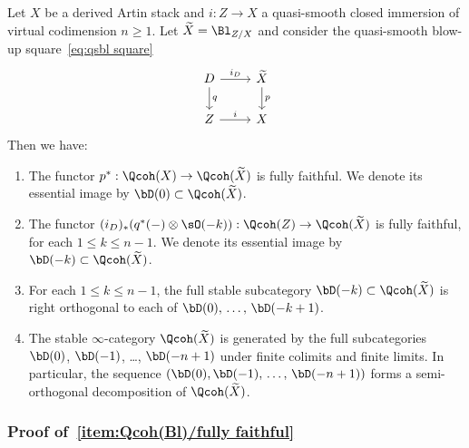 \begin{theo}\label{thm:Qcoh(Bl)}
Let $X$ be a derived Artin stack and $i : Z \to X$ a quasi-smooth closed immersion of virtual codimension $n\ge 1$. Let $\widetilde{X} = \Bl_{Z/X}$ and consider the quasi-smooth blow-up square~\eqref{eq:qsbl square}
\[
\begin{tikzcd}
D \ar{r}{i_D}\ar{d}{q} & \widetilde{X} \ar{d}{p}
\\
Z \ar{r}{i} & X
\end{tikzcd}
\]
Then we have:
\begin{enumerate}\romanenumi
\item \label{item:Qcoh(Bl)/fully faithful}
The functor $p^* : \Qcoh(X) \to \Qcoh(\widetilde{X})$ is fully faithful. We denote its essential image by $\bD(0) \subset \Qcoh(\widetilde{X})$.

\item \label{item:Qcoh(Bl)/fully faithful 2}
The functor $(i_D)_*(q^*(-) \otimes \sO(-k)) : \Qcoh(Z) \to \Qcoh(\widetilde{X})$ is fully faithful, for each $1\le k\le n-1$. We denote its essential image by $\bD(-k) \subset \Qcoh(\widetilde{X})$.

\item \label{item:Qcoh(Bl)/orthogonal}
For each $1\le k\le n-1$, the full stable subcategory $\bD(-k) \subset \Qcoh(\widetilde{X})$ is right orthogonal to each of $\bD(0),\,\ldots,\,\bD(-k+1)$.

\item \label{item:Qcoh(Bl)/generates}
The stable $\infty$-category $\Qcoh(\widetilde{X})$ is generated by the full subcategories $\bD(0)$, $\bD(-1)$, \ldots, $\bD(-n+1)$ under finite colimits and finite limits. In particular, the sequence $(\bD(0), \bD(-1),\,\ldots,\,\bD(-n+1))$ forms a semi-orthogonal decomposition of $\Qcoh(\widetilde{X})$.
\end{enumerate}
\end{theo}

\subsubsection{Proof of~\eqref{item:Qcoh(Bl)/fully faithful}}

